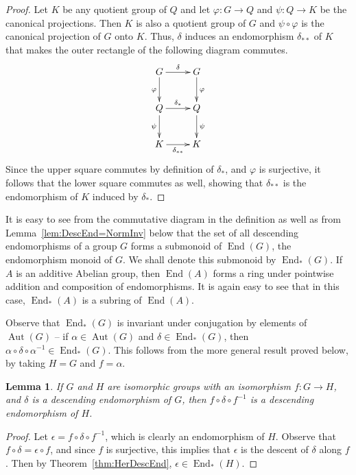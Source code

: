 \documentclass[11pt, a4paper]{article}
\DeclareMathOperator{\End}{End}
\DeclareMathOperator{\Aut}{Aut}
\newtheorem{Lemma}[Theorem]{Lemma}
\theoremstyle{definition}
\begin{document}
\begin{proof}
Let $K$ be any quotient group of $Q$ and let $\varphi\colon G \to Q$ and $\psi\colon Q \to K$ be the canonical projections. Then $K$ is also a quotient group of $G$ and $\psi \circ \varphi$ is the canonical projection of $G$ onto $K$. Thus, $\delta$ induces an endomorphism $\delta_{**}$ of $K$ that makes the outer rectangle of the following diagram commutes.
\begin{equation*}
\xymatrix{
	G \ar[r]^{\delta} \ar[d]_{\varphi} & G \ar[d]^{\varphi}\\
	Q \ar[r]^{\delta_*} \ar[d]_{\psi} & Q \ar[d]^{\psi}\\
	K \ar[r]_{\delta_{**}} & K
}
\end{equation*}
Since the upper square commutes by definition of $\delta_*$, and $\varphi$ is surjective, it follows that the lower square commutes as well, showing that $\delta_{**}$ is the endomorphism of $K$ induced by $\delta_*$.
\end{proof}

It is easy to see from the commutative diagram in the definition as well as from Lemma~\ref{lem:DescEnd=NormInv} below that the set of all descending endomorphisms of a group $G$ forms a submonoid of $\End(G)$, the endomorphism monoid of $G$. We shall denote this submonoid by $\End_*(G)$. If $A$ is an additive Abelian group, then $\End(A)$ forms a ring under pointwise addition and composition of endomorphisms. It is again easy to see that in this case, $\End_*(A)$ is a subring of $\End(A)$.

Observe that $\End_*(G)$ is invariant under conjugation by elements of $\Aut(G)$ -- if $\alpha \in \Aut(G)$ and $\delta \in \End_*(G)$, then $\alpha \circ \delta \circ \alpha^{-1} \in \End_*(G)$. This follows from the more general result proved below, by taking $H = G$ and $f = \alpha$.

\begin{Lemma}\label{lem:DescTransfer}
If $G$ and $H$ are isomorphic groups with an isomorphism $f\colon G \to H$, and $\delta$ is a descending endomorphism of $G$, then $f \circ \delta \circ f^{-1}$ is a descending endomorphism of $H$.
\end{Lemma}
\begin{proof}
Let $\epsilon = f \circ \delta \circ f^{-1}$, which is clearly an endomorphism of $H$. Observe that $f \circ \delta = \epsilon \circ f$, and since $f$ is surjective, this implies that $\epsilon$ is the descent of $\delta$ along $f$. Then by Theorem~\ref{thm:HerDescEnd}, $\epsilon \in \End_*(H)$.
\end{proof}
\end{document}

